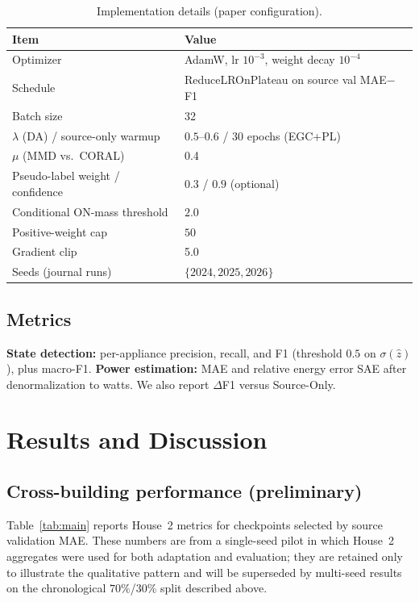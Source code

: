 \documentclass[journal]{IEEEtran}
\begin{document}
\begin{table}[!t]
\caption{Implementation details (paper configuration).}
\label{tab:impl}
\centering
\scriptsize
\begin{tabular}{@{}ll@{}}
\toprule
Item & Value \\
\midrule
Optimizer & AdamW, lr $10^{-3}$, weight decay $10^{-4}$ \\
Schedule & ReduceLROnPlateau on source val MAE$-$F1 \\
Batch size & 32 \\
$\lambda$ (DA) / source-only warmup & $0.5$--$0.6$ / $30$ epochs (EGC+PL) \\
$\mu$ (MMD vs.\ CORAL) & 0.4 \\
Pseudo-label weight / confidence & $0.3$ / $0.9$ (optional) \\
Conditional ON-mass threshold & $2.0$ \\
Positive-weight cap & $50$ \\
Gradient clip & 5.0 \\
Seeds (journal runs) & $\{2024,2025,2026\}$ \\
\bottomrule
\end{tabular}
\end{table}

\subsection{Metrics}
\textbf{State detection:} per-appliance precision, recall, and F1 (threshold $0.5$ on $\sigma(\hat{z})$), plus macro-F1.
\textbf{Power estimation:} MAE and relative energy error SAE after denormalization to watts.
We also report $\Delta$F1 versus Source-Only.

\section{Results and Discussion}
\subsection{Cross-building performance (preliminary)}
Table~\ref{tab:main} reports House~2 metrics for checkpoints selected by source validation MAE.
These numbers are from a single-seed pilot in which House~2 aggregates were used for both adaptation and evaluation; they are retained only to illustrate the qualitative pattern and will be superseded by multi-seed results on the chronological $70\%$/$30\%$ split described above.
\end{document}
